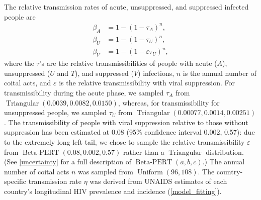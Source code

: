 \documentclass{article}
\DeclareMathOperator{\Uniform}{Uniform}
\DeclareMathOperator{\Triangular}{Triangular}
\DeclareMathOperator{\BetaPERT}{Beta-PERT}
\begin{document}
The relative transmission rates of acute, unsuppressed, and suppressed
infected people are
\begin{equation}
  \label{betas}
  \begin{split}
    \beta_A &= 1 - (1 - \tau_A)^n,
    \\
    \beta_U &= 1 - (1 - \tau_U)^n,
    \\
    \beta_V &= 1 - (1 - \varepsilon \tau_U)^n,
  \end{split}
\end{equation}
where the $\tau$'s are the relative transmissibilities of people with
acute ($A$), unsuppressed ($U$ and $T$), and suppressed ($V$)
infections, $n$ is the annual number of coital acts, and $\varepsilon$
is the relative transmissibility with viral suppression.  For
transmissibility during the acute phase, we sampled $\tau_A$ from
$\Triangular(0.0039, 0.0082, 0.0150)$\cite{Wawer2005-us,
  Skarbinski2015-ni},
whereas, for transmissibility for unsuppressed people, we sampled
$\tau_U$ from
$\Triangular(0.00077, 0.0014, 0.00251)$\cite{Hughes2012-so}.  The
transmissibility of people with viral suppression relative to those
without suppression has been estimated at 0.08 (95\% confidence
interval 0.002, 0.57)\cite{Donnell2010-xo}: due to the extremely long
left tail, we chose to sample the relative transmissibility
$\varepsilon$ from $\BetaPERT(0.08, 0.002, 0.57)$ rather than a
$\Triangular$ distribution.  (See \autoref{uncertainty} for a full
description of $\BetaPERT(a, b, c)$.)  The annual number of coital
acts $n$ was sampled from
$\Uniform(96, 108)$\cite{Wawer2005-us, Abdool_Karim2010-cm}.  The
country-specific transmission rate $\eta$ was derived from UNAIDS
estimates of each country's longitudinal HIV prevalence and incidence
(\autoref{model_fitting}).
\end{document}

